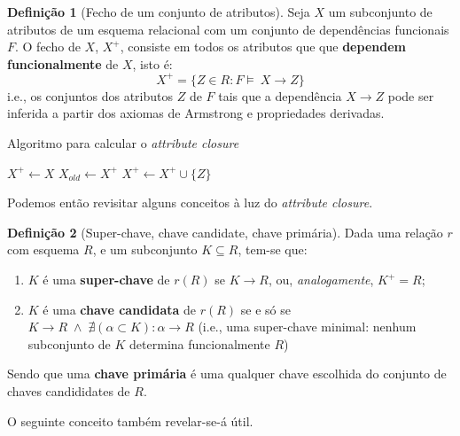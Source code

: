 \documentclass[oneside]{book}
\theoremstyle{definition}
\newtheorem{definition}{Definição}
\begin{document}
\begin{definition}[Fecho de um conjunto de atributos]
    Seja $X$ um subconjunto de atributos de um esquema relacional com um conjunto de dependências funcionais $F$. O fecho de $X$, $X^{+}$, consiste em todos os atributos que que \textbf{dependem funcionalmente} de $X$, isto é:
    \begin{equation*}
        X^{+} = \{ Z \in R: F \models \: X \rightarrow Z \}
    \end{equation*}
    i.e., os conjuntos dos atributos $Z$ de $F$ tais que a dependência $X \rightarrow Z$ pode ser inferida a partir dos axiomas de Armstrong e propriedades derivadas.
\end{definition}
\vspace{-0.3em}
\begin{algorithm}
    \caption{Algoritmo para calcular o \textit{attribute closure}}\label{alg:cap}
    \begin{algorithmic}
    \State $X^{+} \gets X$
    \Repeat
        \State $X_{old} \gets X^{+}$
                \State
                $X^{+} \gets  X^{+} \cup \{Z\}$
            \EndIf
        \EndFor
    \end{algorithmic}
 \end{algorithm}

Podemos então revisitar alguns conceitos à luz do \textit{attribute closure}.

\begin{definition} [Super-chave, chave candidate, chave primária]
    Dada uma relação $r$ com esquema $R$, e um subconjunto $K \subseteq R$, tem-se que:
    \begin{enumerate}
        \item $K$ é uma \textbf{super-chave} de $r(R)$ se $K \rightarrow R$, ou, \textit{analogamente}, $K^{+} = R$;
        \item $K$ é uma \textbf{chave candidata} de $r(R)$ se e só se  $K \rightarrow R \; \wedge \; \nexists(\alpha \subset K): \alpha \rightarrow R$ (i.e., uma super-chave minimal: nenhum subconjunto de $K$ determina funcionalmente $R$)
    \end{enumerate}
    Sendo que uma \textbf{chave primária} é uma qualquer chave escolhida do conjunto de chaves candididates de $R$.
\end{definition}

O seguinte conceito também revelar-se-á útil.
\end{document}
